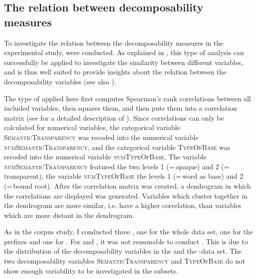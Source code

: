 \subsection{The relation between decomposability measures}\largerpage

To investigate the relation between the decomposability measures in the experimental study,  were conducted. As  explained in , this type of analysis can successfully be applied to investigate the similarity between different variables, and is thus well suited to provide insights about the relation between the decomposability variables (see also \citealt[200f.]{Baayen.2008}). 

The type of  applied here first computes Spearman's rank correlations between all included variables, then squares them, and then puts them into a correlation matrix  (see  for a detailed description of ). 
Since correlations can only be calculated for numerical variables, 
the categorical variable \textsc{SemanticTransparency}  was recoded into the numerical variable \textsc{numSemanticTransparency}, and the categorical variable \textsc{TypeOfBase} was recoded into the numerical variable \textsc{numTypeOfBase}.  The variable \textsc{numSemanticTransparency} featured  the two levels 1 (=\,opaque) and 2 (=\,transparent), the variable \textsc{numTypeOfBase} the levels 1 (=\,word as base) and 2 (=\,bound root). After the correlation matrix was created,  a dendrogram in which the correlations are displayed was generated. Variables which cluster together in the dendrogram are more similar, i.e. have a higher correlation, than variables which are more distant in the dendrogram. 


As in the corpus study, I conducted three , one for the whole data set, one for the prefixes and one for .  
For  and , it was not reasonable to conduct . This is due to the distribution of the decomposability variables in the  and the -data set. The two decomposability variables \textsc{SemanticTransparency} and \textsc{TypeOfBase} do not show enough variability to be investigated in the subsets. 


